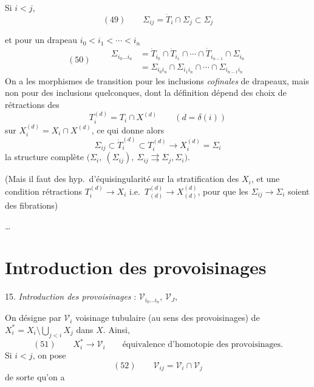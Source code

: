 \documentclass[11pt,a4paper]{article}
\begin{document}

Si $i<j$, 
\[
(49)\qquad \Sigma_{ij}=\dot T_i\cap\Sigma_j\subset\Sigma_j
\]

et pour un drapeau $i_0<i_1<\cdots<i_n$
\[
(50)\qquad
\begin{aligned}
\Sigma_{i_0\ldots i_n}&=\dot T_{i_0}\cap\dot T_{i_1}\cap\cdots\cap\dot T_{i_{n-1}}\cap\Sigma_{i_n}\\
&=\Sigma_{i_0i_n}\cap\Sigma_{i_1i_n}\cap\cdots\cap\Sigma_{i_{n-1}i_n}
\end{aligned}
\]
On a  les morphismes de transition  pour les  inclusions \emph{cofinales} de drapeaux, mais non pour des inclusions quelconques, dont la définition dépend des choix de rétractions des
\[
T_i^{(d)}=T_i\cap X^{(d)}\qquad(d=\delta(i))
\]
sur $X_i^{(d)}=X_i\cap X^{(d)}$, ce qui donne alors
\[
\Sigma_{ij}\subset\dot T_i^{(d)}\subset T_i^{(d)}\longrightarrow X_i^{(d)}=\Sigma_i
\]
la structure complète $\bigl(\Sigma_i,\ (\Sigma_{ij}),\ \Sigma_{ij}\rightrightarrows\Sigma_j,\Sigma_i\bigr)$.

(Mais il faut des hyp.\ d'équisingularité sur la stratification des $X_i$, et une condition   rétractions $T_i^{(d)}\to X_i$ i.e.\ $T^{(d)}_{(d)}\to X^{(d)}_{(d)}$, pour que les $\Sigma_{ij}\to\Sigma_i$ soient des fibrations)

\ldots

\section*{Introduction des provoisinages}


15. \emph{Introduction des provoisinages} : $\mathcal V_{i_0\ldots i_n}$, $\mathcal V_J$,

On désigne par $\mathcal V_i$ \struck{\ill{}} voisinage tubulaire (au sens des provoisinages) de $X_i^{*}=X_i\setminus\bigcup_{j<i}X_j$ dans $X$. Ainsi, \struck{\ill{}}
\[
(51)\qquad X_i^{*}\longrightarrow \mathcal V_i\qquad\text{équivalence d'homotopie des provoisinages.}
\]
 Si $i<j$, on pose
\[
(52)\qquad \mathcal V_{ij}=\mathcal V_i\cap \mathcal V_j
\]
de sorte qu'on a
\end{document}
